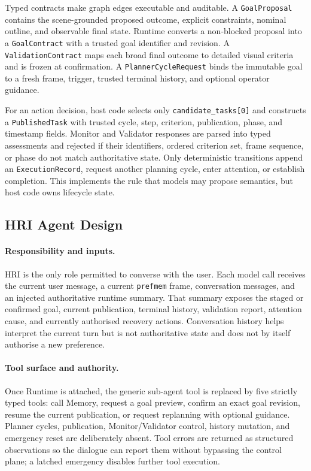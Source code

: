 \documentclass{article}
\begin{document}
Typed contracts make graph edges executable and auditable. A
\texttt{GoalProposal} contains the scene-grounded proposed outcome, explicit
constraints, nominal outline, and observable final state. Runtime converts a
non-blocked proposal into a \texttt{GoalContract} with a trusted goal identifier
and revision. A \texttt{ValidationContract} maps each broad final outcome to
detailed visual criteria and is frozen at confirmation. A
\texttt{PlannerCycleRequest} binds the immutable goal to a fresh frame, trigger,
trusted terminal history, and optional operator guidance.

For an action decision, host code selects only
\texttt{candidate\_tasks[0]} and constructs a \texttt{PublishedTask} with trusted
cycle, step, criterion, publication, phase, and timestamp fields. Monitor and
Validator responses are parsed into typed assessments and rejected if their
identifiers, ordered criterion set, frame sequence, or phase do not match
authoritative state. Only deterministic transitions append an
\texttt{ExecutionRecord}, request another planning cycle, enter attention, or
establish completion. This implements the rule that models may propose
semantics, but host code owns lifecycle state.

\newpage

\subsection{HRI Agent Design}
\label{subsec:methodology-hri}

\paragraph{Responsibility and inputs.}
HRI is the only role permitted to converse with the user. Each model call
receives the current user message, a current \texttt{prefmem} frame,
conversation messages, and an injected authoritative runtime summary. That
summary exposes the staged or confirmed goal, current publication, terminal
history, validation report, attention cause, and currently authorised recovery
actions. Conversation history helps interpret the current turn but is not
authoritative state and does not by itself authorise a new preference.

\paragraph{Tool surface and authority.}
Once Runtime is attached, the generic sub-agent tool is replaced by five
strictly typed tools: call Memory, request a goal preview, confirm an exact goal
revision, resume the current publication, or request replanning with optional
guidance. Planner cycles, publication, Monitor/Validator control, history
mutation, and emergency reset are deliberately absent. Tool errors are returned
as structured observations so the dialogue can report them without bypassing
the control plane; a latched emergency disables further tool execution.
\end{document}
